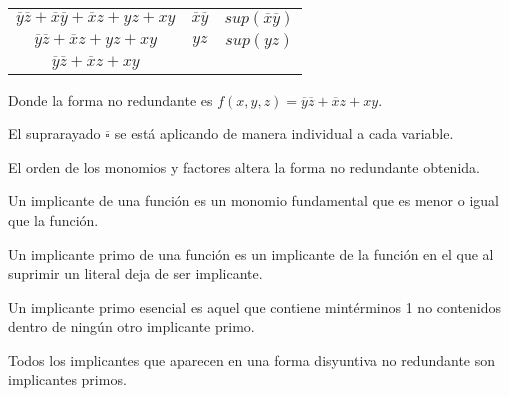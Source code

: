 \begin{ejemplo}
\begin{center}
\begin{tabular}{ |c|c|c|  }
            $\overline{y}\overline{z}+\overline{x}\overline{y}+\overline{x}z+yz+xy$                                                      & $\overline{x}\overline{y}$             & $sup(\overline{x}\overline{y})$  \\
            $\overline{y}\overline{z}+\overline{x}z+yz+xy$                                                                               & $yz$                                   & $sup(yz)$                        \\
            $\overline{y}\overline{z}+\overline{x}z+xy$                                                                                  &                                        &                                  \\
            \hline
        \end{tabular}
    \end{center}
    Donde la forma no redundante es $f(x,y,z) =\overline{y}\overline{z}+\overline{x}z+xy$.
    \begin{nota}
        El suprarayado $\overline{\square}$ se está aplicando de manera individual a cada variable.
    \end{nota}
    \begin{obs}
        El orden de los monomios y factores altera la forma no redundante obtenida.
    \end{obs}
\end{ejemplo}
\smallskip
\begin{ndef}[Implicante]
    Un implicante de una función es un monomio fundamental que es menor o igual que la función.
\end{ndef}

\begin{ndef}
    Un implicante primo de una función es un implicante de la función en el que al suprimir un literal deja de ser implicante.
\end{ndef}

\begin{ndef}
    Un implicante primo esencial es aquel que contiene mintérminos 1 no contenidos dentro de ningún otro implicante primo.
\end{ndef}

\begin{nota}
    Todos los implicantes que aparecen en una forma disyuntiva no redundante son implicantes primos.
\end{nota}

